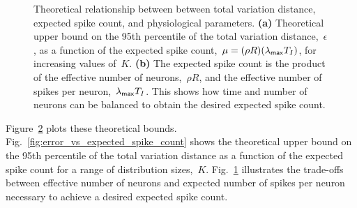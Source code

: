 \begin{figure}[t!]
\begin{subfigure}[b]{2.75in}
   \label{fig:mu_vs_R_T}
 \end{subfigure}
 \vspace{-.3in}
 \caption[Theoretical bounds on expected spike count and physiological parameters]
 { Theoretical relationship between between total variation distance, expected spike
   count, and physiological parameters. 
   \textbf{(a)} Theoretical 
   upper bound on the 95th percentile of the total variation distance,~$\epsilon$, 
   as a function of the expected spike count,~$\mu = (\rho R) (\lambda_{\mathsf{max}} T_I)$,
   for increasing values of~$K$. 
   \textbf{(b)} The expected spike count is the product of the effective number 
   of neurons,~$\rho R$, and the effective number of spikes per neuron,~$\lambda_{\mathsf{max}} T_I$.
   This shows how time and number of neurons can be balanced to obtain the desired 
   expected spike count.
 }
 \label{fig:theoretical_complexity}
\end{figure}

Figure~\ref{fig:theoretical_complexity} plots these theoretical 
bounds. Fig.~\ref{fig:error_vs_expected_spike_count} shows the theoretical
upper bound on the 95th percentile of the total variation distance as a
function of the expected spike count for a range of distribution sizes,~$K$.
Fig.~\ref{fig:mu_vs_R_T} illustrates the trade-offs between effective 
number of neurons and expected number of spikes per neuron necessary 
to achieve a desired expected spike count.


